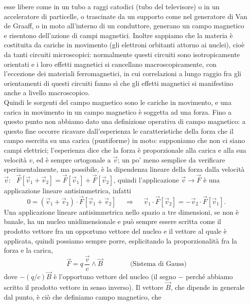 esse libere come in un tubo a raggi catodici (tubo del televisore) o in un
acceleratore di particelle, o trascinate da un supporto come nel generatore di
Van de Graaff, o in moto all'interno di un conduttore, generano un campo
magnetico e risentono dell'azione di campi magnetici. Inoltre sappiamo che la
materia \`e costituita da cariche in movimento (gli elettroni orbitanti attorno
ai nuclei), cio\`e da tanti circuiti microscopici: normalmente questi circuiti
sono isotropicamente orientati e i loro effetti magnetici si cancellano
macroscopicamente, con l'eccezione dei materiali ferromagnetici, in cui
correlazioni a lungo raggio fra gli orientamenti di questi circuiti fanno s\`i
che gli effetti magnetici si manifestino anche a livello macroscopico.\\
Quindi le sorgenti del campo magnetico sono le cariche in movimento, e una
carica in movimento in un campo magnetico \`e soggetta ad una forza. Fino a
questo punto non abbiamo dato una definizione operativa di campo magnetico: a
questo fine occorre ricavare dall'esperienza le caratteristiche della forza che
il campo esercita su una carica (puntiforme) in moto: supponiamo che non ci
siano campi elettrici; l'esperienza dice che la forza \`e proporzionale alla
carica e alla sua velocit\`a $v$, ed \`e sempre ortogonale a $\vec v$; un po'
meno semplice da verificare sperimentalmente, ma possibile, \`e la dipendenza
lineare della forza dalla velocit\`a $\vec v$:
\ $\vec F[\vec v_1+\vec v_2]=\vec F[\vec v_1]+\vec F[\vec v_2]$, quindi
l'applicazione $\vec v\to\vec F$ \`e una applicazione lineare antisimmetrica,
infatti
\begin{equation}
  0=(\vec v_1+\vec v_2)\cdot\vec F[\vec v_1+\vec v_2]\quad\ \Rightarrow
  \quad\ \vec v_1\cdot\vec F[\vec v_2]=-\vec v_2\cdot\vec F[\vec v_1].
  \tag{4.1}
\end{equation}
Una applicazione lineare antisimmetrica nello spazio a tre dimensioni, se non
\`e banale, ha un nucleo unidimensionale e pu\`o sempre essere scritta come il
prodotto vettore fra un opportuno vettore del nucleo e il vettore al quale \`e
applicata, quindi possiamo sempre porre, esplicitando la proporzionalit\`a fra
la forza e la carica,
\begin{equation}
  \vec F=q\,\frac{\vec v}{c}\wedge\vec B\qquad\qquad\text{(Sistema di Gauss)}
  \tag{4.2}
\end{equation}
dove $-(q/c)\vec B$ \`e l'opportuno vettore del nucleo (il segno $-$ perch\'e
abbiamo scritto il prodotto vettore in senso inverso). Il vettore $\vec B$, che
dipende in generale dal punto, \`e ci\`o che definiamo campo magnetico, che

